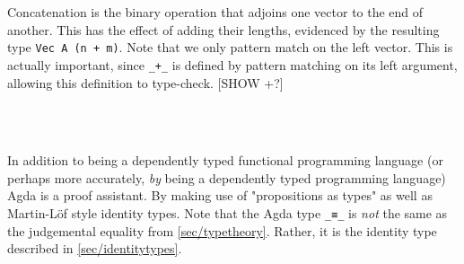 Concatenation is the binary operation that adjoins one vector to the end of another.
This has the effect of adding their lengths, evidenced by the resulting type \texttt{Vec A (n + m)}.
Note that we only pattern match on the left vector. This is actually important, since \texttt{\_+\_} is defined
by pattern matching on its left argument, allowing this definition to type-check. [SHOW +?]
\begin{code}%
\>[0]\AgdaOperator{\AgdaFunction{\AgdaUnderscore{}++\AgdaUnderscore{}}}\AgdaSpace{}%
\AgdaSymbol{:}\AgdaSpace{}%
\AgdaSymbol{\{}\AgdaSpace{}%
\AgdaSymbol{:}\AgdaSpace{}%
\AgdaSymbol{\}}\AgdaSpace{}%
\AgdaSymbol{\{}\AgdaSpace{}%
\AgdaSpace{}%
\AgdaSymbol{:}\AgdaSpace{}%
\AgdaSymbol{\}}\AgdaSpace{}%
\AgdaSpace{}%
\AgdaSpace{}%
\AgdaSpace{}%
\AgdaSpace{}%
\AgdaSpace{}%
\AgdaSpace{}%
\AgdaSpace{}%
\AgdaSpace{}%
\AgdaSpace{}%
\AgdaSpace{}%
\AgdaSpace{}%
\AgdaSymbol{(}\AgdaSpace{}%
\AgdaOperator{\AgdaFunction{+}}\AgdaSpace{}%
\AgdaSymbol{)}\<%
\\
\>[0]\AgdaInductiveConstructor{[]}\AgdaSpace{}%
\AgdaOperator{\AgdaFunction{++}}\AgdaSpace{}%
\AgdaSpace{}%
\AgdaSymbol{=}\AgdaSpace{}%
\<%
\\
\>[0]\AgdaSymbol{(}\AgdaSpace{}%
\AgdaOperator{\AgdaInductiveConstructor{::}}\AgdaSpace{}%
\AgdaSymbol{)}\AgdaSpace{}%
\AgdaOperator{\AgdaFunction{++}}\AgdaSpace{}%
\AgdaSpace{}%
\AgdaSymbol{=}\AgdaSpace{}%
\AgdaSpace{}%
\AgdaOperator{\AgdaInductiveConstructor{::}}\AgdaSpace{}%
\AgdaSymbol{(}\AgdaSpace{}%
\AgdaOperator{\AgdaFunction{++}}\AgdaSpace{}%
\AgdaSymbol{)}\<%
\end{code}

In addition to being a dependently typed functional programming language
(or perhaps more accurately, \emph{by} being a dependently typed programming language)
Agda is a proof assistant. By making use of "propositions as types" as well as Martin-Löf style
identity types.
Note that the Agda type \texttt{\_≡\_} is \emph{not} the same as the judgemental equality from \autoref{sec/typetheory}.
Rather, it is the identity type described in \autoref{sec/identitytypes}.


